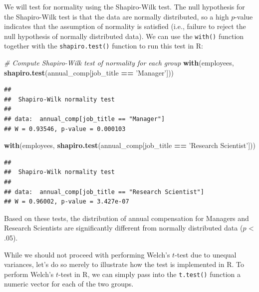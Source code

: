\documentclass[]{book}
\newenvironment{Shaded}{\begin{snugshade}}{\end{snugshade}}
\newcommand{\CommentTok}[1]{\textcolor[rgb]{0.56,0.35,0.01}{\textit{#1}}}
\newcommand{\KeywordTok}[1]{\textcolor[rgb]{0.13,0.29,0.53}{\textbf{#1}}}
\newcommand{\NormalTok}[1]{#1}
\newcommand{\OperatorTok}[1]{\textcolor[rgb]{0.81,0.36,0.00}{\textbf{#1}}}
\newcommand{\StringTok}[1]{\textcolor[rgb]{0.31,0.60,0.02}{#1}}
\begin{document}
We will test for normality using the Shapiro-Wilk test. The null hypothesis for the Shapiro-Wilk test is that the data are normally distributed, so a high \(p\)-value indicates that the assumption of normality is satisfied (i.e., failure to reject the null hypothesis of normally distributed data). We can use the \texttt{with()} function together with the \texttt{shapiro.test()} function to run this test in R:

\begin{Shaded}
\begin{Highlighting}[]
\CommentTok{# Compute Shapiro-Wilk test of normality for each group}
\KeywordTok{with}\NormalTok{(employees, }\KeywordTok{shapiro.test}\NormalTok{(annual_comp[job_title }\OperatorTok{==}\StringTok{ 'Manager'}\NormalTok{]))}
\end{Highlighting}
\end{Shaded}

\begin{verbatim}
## 
##  Shapiro-Wilk normality test
## 
## data:  annual_comp[job_title == "Manager"]
## W = 0.93546, p-value = 0.000103
\end{verbatim}

\begin{Shaded}
\begin{Highlighting}[]
\KeywordTok{with}\NormalTok{(employees, }\KeywordTok{shapiro.test}\NormalTok{(annual_comp[job_title }\OperatorTok{==}\StringTok{ 'Research Scientist'}\NormalTok{]))}
\end{Highlighting}
\end{Shaded}

\begin{verbatim}
## 
##  Shapiro-Wilk normality test
## 
## data:  annual_comp[job_title == "Research Scientist"]
## W = 0.96002, p-value = 3.427e-07
\end{verbatim}

Based on these tests, the distribution of annual compensation for Managers and Research Scientists are significantly different from normally distributed data (\(p\) \textless{} .05).

While we should not proceed with performing Welch's \(t\)-test due to unequal variances, let's do so merely to illustrate how the test is implemented in R. To perform Welch's \(t\)-test in R, we can simply pass into the \texttt{t.test()} function a numeric vector for each of the two groups.
\end{document}
